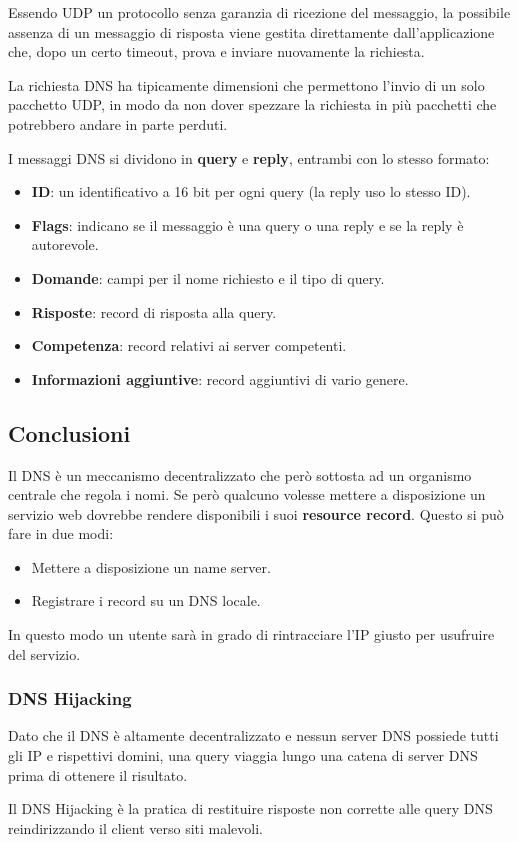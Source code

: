 Essendo UDP un protocollo senza garanzia di ricezione del messaggio, la
possibile assenza di un messaggio di risposta viene gestita 
direttamente dall'applicazione che, dopo un certo timeout, prova e 
inviare nuovamente la richiesta.

La richiesta DNS ha tipicamente dimensioni che permettono l'invio di un
solo pacchetto UDP, in modo da non dover spezzare la richiesta in più 
pacchetti che potrebbero andare in parte perduti.

I messaggi DNS si dividono in \textbf{query} e \textbf{reply}, entrambi
con lo stesso formato:
\begin{itemize}
	\item \textbf{ID}: un identificativo a 16 bit per ogni query (la 
		reply uso lo stesso ID).
	\item \textbf{Flags}: indicano se il messaggio è una query o una 
		reply e se la reply è autorevole.
	\item \textbf{Domande}: campi per il nome richiesto e il tipo di 
		query.
	\item \textbf{Risposte}: record di risposta alla query.
	\item \textbf{Competenza}: record relativi ai server competenti.
	\item \textbf{Informazioni aggiuntive}: record aggiuntivi di vario 
		genere.
\end{itemize}

\subsection{Conclusioni}
Il DNS è un meccanismo decentralizzato che però sottosta ad un 
organismo centrale che regola i nomi. Se però qualcuno volesse mettere 
a disposizione un servizio web dovrebbe rendere disponibili i suoi 
\textbf{resource record}. Questo si può fare in due modi:
\begin{itemize}
	\item Mettere a disposizione un name server.
	\item Registrare i record su un DNS locale.
\end{itemize}
In questo modo un utente sarà in grado di rintracciare l'IP giusto 
per usufruire del servizio.

\subsubsection{DNS Hijacking}
Dato che il DNS è altamente decentralizzato e nessun server DNS 
possiede tutti gli IP e rispettivi domini, una query viaggia lungo una 
catena di server DNS prima di ottenere il risultato.

Il DNS Hijacking è la pratica di restituire risposte non corrette alle 
query DNS reindirizzando il client verso siti malevoli.
